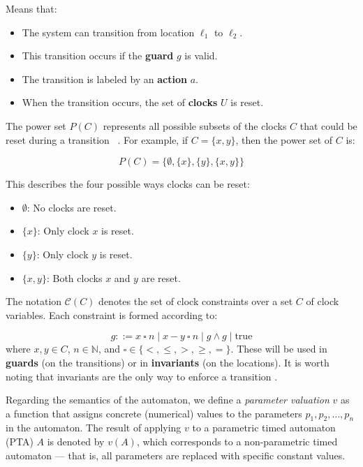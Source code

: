 Means that:
\begin{itemize}
    \item The system can transition from location \( \ell_1 \) to \( \ell_2 \).
    \item This transition occurs if the \textbf{guard} \( g \) is valid.
    \item The transition is labeled by an \textbf{action} \( a \).
    \item When the transition occurs, the set of \textbf{clocks} \( U \) is reset.
\end{itemize}

The power set \( P(C) \) represents all possible subsets of the clocks \( C \) that could be reset during a transition ~\cite{baukus2002power}. For example, if \( C = \{x, y\} \), then the power set of \( C \) is:

\[
P(C) = \{\emptyset, \{x\}, \{y\}, \{x, y\}\}
\]

This describes the four possible ways clocks can be reset:

\begin{itemize}
    \item \( \emptyset \): No clocks are reset.
    \item \( \{x\} \): Only clock \( x \) is reset.
    \item \( \{y\} \): Only clock \( y \) is reset.
    \item \( \{x, y\} \): Both clocks \( x \) and \( y \) are reset.
\end{itemize} 

The notation \( \mathcal{C}(C) \) denotes the set of clock constraints over a set \( C \) of clock variables. Each constraint is formed according to:

\[
g ::= x \ \square \ n \mid x - y \ \square \ n \mid g \land g \mid \text{true}
\]
where \( x, y \in C \), \( n \in \mathbb{N} \), and \( \square \in \{ <, \leq, >, \geq, = \} \). These will be used in \textbf{guards} (on the transitions) or in \textbf{invariants} (on the locations). It is worth noting that invariants are the only way to enforce a transition \cite{proenca_slides}.

Regarding the semantics of the automaton, we define a \emph{parameter valuation} $v$ as a function that assigns concrete (numerical) values to the parameters $p_1, p_2, \ldots, p_n$ in the automaton. The result of applying $v$ to a parametric timed automaton (PTA) $A$ is denoted by $v(A)$, which corresponds to a non-parametric timed automaton --- that is, all parameters are replaced with specific constant values.

